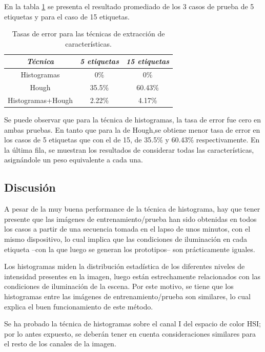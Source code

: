 \documentclass[conference,a4paper,10pt,oneside,final]{tfmpd}
\begin{document}
En la tabla \ref{tablaerrores} se presenta el resultado promediado de los 3
{casos de prueba} de 5 etiquetas {y para el caso de} 15 etiquetas.

\begin{table}
\caption{Tasas de error para {las técnicas de extracción de características}.}
\begin{center}\begin{tabular}{ccc}
\hline \emph{{Técnica}} & \emph{5 etiquetas} & \emph{15 etiquetas}\\
\hline Histogramas & 0\% & 0\%\\
\hline Hough & 35.5\% & 60.43\%\\
\hline Histogramas+Hough & 2.22\% & 4.17\%\\
\hline
\end{tabular}\end{center}
\label{tablaerrores}
\end{table}
%
Se puede observar que para {la técnica} de histogramas,
la tasa de error fue cero
en ambas pruebas. En tanto que para {la} de Hough,se obtiene menor tasa de
error {en los casos} de 5 etiquetas que con el de 15, de 35.5\% y 60.43\%
respectivamente. En la última fila, se muestran los resultados de
con\-si\-de\-rar todas las características, %
asignándole un peso equivalente a cada una.
%
%
\subsection*{Discusión}
A pesar de la muy buena performance de la técnica de histograma, hay que tener
presente que las  imágenes de entrenamiento/prueba han sido obtenidas
en todos los casos a partir de una secuencia tomada en el
lapso de unos minutos, con el mismo dispositivo, lo cual implica que las
condiciones de iluminación en cada etiqueta --con la que luego se generan
los prototipos-- son prácticamente iguales.

Los histogramas miden la distribución estadística de los diferentes niveles
de intensidad presentes en la imagen, luego están estrechamente relacionados
con las condiciones de iluminación de la escena. Por este motivo, se tiene
que los histogramas entre las imágenes de entrenamiento/prueba son
similares, lo cual explica el buen funcionamiento de este método.

Se ha probado la técnica de histogramas sobre el canal I del espacio de color
HSI; por lo antes expuesto, se deberán tener en cuenta consideraciones similares
para el resto de los canales de la imagen.
\end{document}
